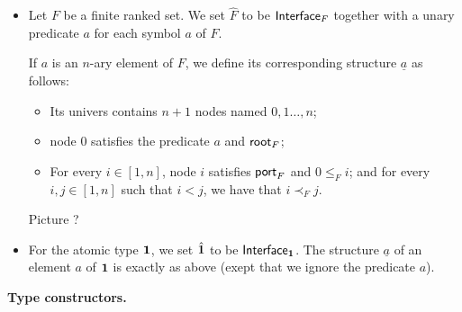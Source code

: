    \begin{itemize}
   \item Let $F$ be a finite ranked set.  We set $\hat F$ to be $\mathsf{Interface}_{F}$ together with a unary predicate $a$ for each symbol $a$ of $F$. 
            
            If $a$ is an $n$-ary element of $F$, we define its corresponding structure $\underline a$ as follows:
            \begin{itemize}
            \item Its univers contains $n+1$ nodes named $0,1\dots,n$;
            \item node $0$ satisfies the predicate $a$ and $\mathsf{root}_{F}$;
            \item For every $i\in[1,n]$, node $i$ satisfies $\mathsf{port}_{F}$  and $0\leq_F i$; and for every $i, j \in[1,n]$ such that $i< j$, we have that $i\prec_F j$.
\end{itemize}             
            \begin{center}
            Picture ?
            \end{center}
            \item For the atomic type $\mathbf{1}$, we set $\hat {\mathbf{1}}$ to be $\mathsf{Interface}_{\mathbf{1}}$. The structure $\underline a$ of an element $a$ of $\mathbf{1}$ is exactly as above (exept that we ignore the predicate $a$).
        \end{itemize}
    {\bf Type constructors.}
    

